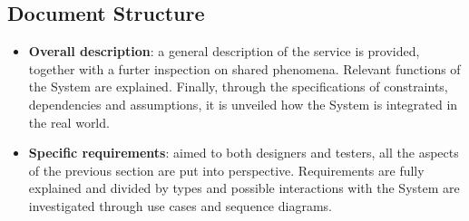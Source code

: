 \subsection{Document Structure}

\begin{itemize}

\item \textbf{Overall description}: a general description of the service is provided, together with a furter inspection on shared phenomena. Relevant functions of the System are explained. Finally, through the specifications of constraints, dependencies and assumptions, it is unveiled how the System is integrated in the real world.

\item \textbf{Specific requirements}: aimed to both designers and testers, all the aspects of the previous section are put into perspective. Requirements
are fully explained and divided by types and possible interactions with the System are investigated through use cases and sequence diagrams.

\end{itemize}